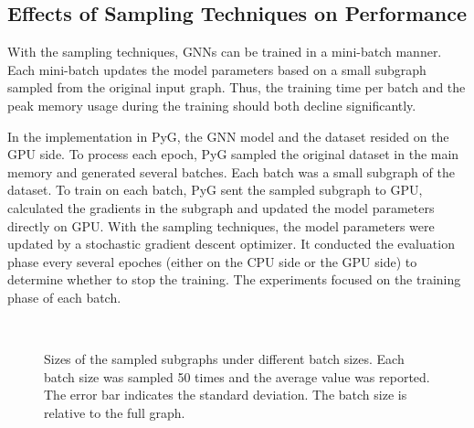 \subsection{Effects of Sampling Techniques on Performance}
\label{sec:effects_of_sampling_techniques_on_performance}

With the sampling techniques, GNNs can be trained in a mini-batch manner.
Each mini-batch updates the model parameters based on a small subgraph sampled from the original input graph.
Thus, the training time per batch and the peak memory usage during the training should both decline significantly.

In the implementation in PyG, the GNN model and the dataset resided on the GPU side.
To process each epoch, PyG sampled the original dataset in the main memory and generated several batches.
Each batch was a small subgraph of the dataset.
To train on each batch, PyG sent the sampled subgraph to GPU, calculated the gradients in the subgraph and updated the model parameters directly on GPU.
With the sampling techniques, the model parameters were updated by a stochastic gradient descent optimizer.
It conducted the evaluation phase every several epoches (either on the CPU side or the GPU side) to determine whether to stop the training.
The experiments focused on the training phase of each batch.

\begin{figure}
    \centering
     \\
    \caption{Sizes of the sampled subgraphs under different batch sizes. Each batch size was sampled 50 times and the average value was reported. The error bar indicates the standard deviation. The batch size is relative to the full graph.}
    \label{fig:exp_sampling_minibatch_graph_info}
\end{figure}

